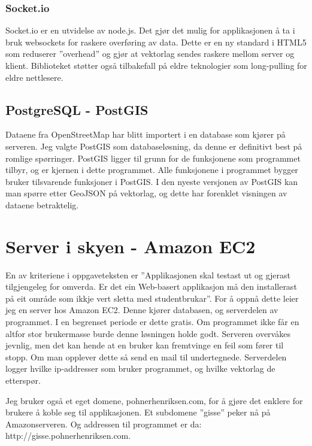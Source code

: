 \documentclass[12pt,twoside,onecolumn]{article}
\begin{document}
		\subsubsection{Socket.io\cite{node}}
		
		Socket.io er en utvidelse av node.js. Det gjør det mulig for applikasjonen å ta i bruk websockets for raskere overføring av data. Dette er en ny standard i HTML5 som reduserer ''overhead'' og gjør at vektorlag sendes raskere mellom server og klient. Biblioteket støtter også tilbakefall på eldre teknologier som long-pulling for eldre nettlesere.
		
	\subsection{PostgreSQL - PostGIS\cite{postgis}}
		
		Dataene fra OpenStreetMap har blitt importert i en database som kjører på serveren. Jeg valgte PostGIS som databaseløsning, da denne er definitivt best på romlige spørringer. PostGIS ligger til grunn for de funksjonene som programmet tilbyr, og er kjernen i dette programmet. Alle funksjonene i programmet bygger bruker tilsvarende funksjoner i PostGIS. I den nyeste versjonen av PostGIS kan man spørre etter GeoJSON på vektorlag, og dette har forenklet visningen av dataene betraktelig. 
		

\section{Server i skyen - Amazon EC2\cite{ec2}}

	En av kriteriene i oppgaveteksten er ''Applikasjonen skal testast ut og gjerast tilgjengeleg for omverda. Er det ein Web-basert applikasjon må den installerast på eit område som ikkje vert sletta med studentbrukar''. For å oppnå dette leier jeg en server hos Amazon EC2. Denne kjører databasen, og serverdelen av programmet. I en begrenset periode er dette gratis. Om programmet ikke får en altfor stor brukermasse burde denne løsningen holde godt. Serveren overvåkes jevnlig, men det kan hende at en bruker kan fremtvinge en feil som fører til stopp. Om man opplever dette så send en mail til undertegnede. Serverdelen logger hvilke ip-addresser som bruker programmet, og hvilke vektorlag de etterspør.
	
	Jeg bruker også et eget domene, pohnerhenriksen.com, for å gjøre det enklere for brukere å koble seg til applikasjonen. Et subdomene ''gisse'' peker nå på Amazonserveren. Og addressen til programmet er da: http://gisse.pohnerhenriksen.com. 
	
\end{document}
